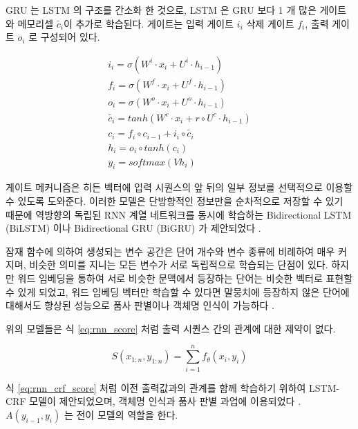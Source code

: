 \documentclass[oneside, ko,phd]{snuthesis_utf8_kor}
\begin{document}
GRU 는 LSTM 의 구조를 간소화 한 것으로, LSTM 은 GRU 보다 1 개 많은 게이트와 메모리셀 $\tilde{c_i}$이 추가로 학습된다.
게이트는 입력 게이트 $i_i$ 삭제 게이트 $f_i$, 출력 게이트 $o_i$ 로 구성되어 있다.

\begin{equation}
  \label{eq:lstm}
  \begin{aligned}
  i_i = \sigma(W^i \cdot x_i + U^i \cdot h_{i-1}) \\
  f_i = \sigma(W^f \cdot x_i + U^f \cdot h_{i-1}) \\
  o_i = \sigma(W^o \cdot x_i + U^o \cdot h_{i-1}) \\
  \tilde{c_i} = tanh \left( W^c \cdot x_i + r \circ U^c \cdot h_{i-1}\right) \\
  c_i = f_i \circ c_{i-1} + i_i \circ \tilde{c_i} \\
  h_i = o_i \circ tanh (c_i) \\
  y_i = softmax(Vh_i)
  \end{aligned}
\end{equation}

게이트 메커니즘은 히든 벡터에 입력 시퀀스의 앞 뒤의 일부 정보를 선택적으로 이용할 수 있도록 도와준다.
이러한 모델은 단방향적인 정보만을 순차적으로 저장할 수 있기 때문에 역방향의 독립된 RNN 계열 네트워크를 동시에 학습하는 Bidirectional LSTM (BiLSTM) 이나 Bidirectional GRU (BiGRU) 가 제안되었다 \cite{graves2005bidirectional}.

잠재 함수에 의하여 생성되는 변수 공간은 단어 개수와 변수 종류에 비례하여 매우 커지며, 비슷한 의미를 지니는 모든 변수가 서로 독립적으로 학습되는 단점이 있다.
하지만 워드 임베딩을 통하여 서로 비슷한 문맥에서 등장하는 단어는 비슷한 벡터로 표현할 수 있게 되었고, 워드 임베딩 벡터만 학습할 수 있다면 말뭉치에 등장하지 않은 단어에 대해서도 향상된 성능으로 품사 판별이나 객체명 인식이 가능하다 \cite{collobert2011natural, lample2016neural}.

위의 모델들은 식 \ref{eq:rnn_score} 처럼 출력 시퀀스 간의 관계에 대한 제약이 없다.

\begin{equation}
  \label{eq:rnn_score}
  S(x_{1:n}, y_{1:n}) = \sum_{i=1}^n f_\theta(x_i, y_i)
\end{equation}

식 \ref{eq:rnn_crf_score} 처럼 이전 출력값과의 관계를 함께 학습하기 위하여 LSTM-CRF 모델이 제안되었으며, 객체명 인식과 품사 판별 과업에 이용되었다 \cite{ma2016end, santos2014learning, lample2016neural}.
$A(y_{i-1}, y_i)$ 는 전이 모델의 역할을 한다.
\end{document}
